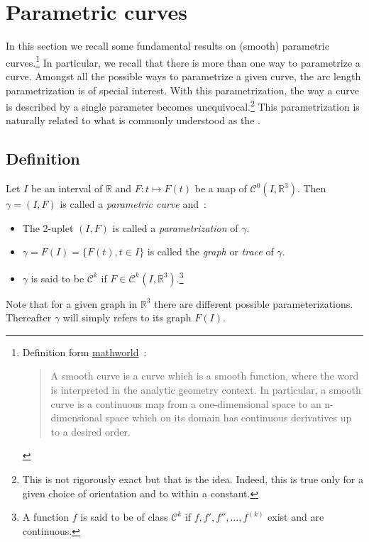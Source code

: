 \section{Parametric curves}\label{sec=paramcrvs}

In this section we recall some fundamental results on (smooth) parametric curves.\footnote{Definition form \href{http://mathworld.wolfram.com/SmoothCurve.html}{mathworld}~: \blockquote{A smooth curve is a curve which is a smooth function,  where the word  is interpreted in the analytic geometry context. In particular, a smooth curve is a continuous map from a one-dimensional space to an n-dimensional space which on its domain has continuous derivatives up to a desired order.}.} In particular, we recall that there is more than one way to parametrize a curve. Amongst all the possible ways to parametrize a given curve, the arc length parametrization is of special interest. With this parametrization, the way a curve is described by a single parameter becomes unequivocal.\footnote{This is not rigorously exact but that is the idea. Indeed, this is true only for a given choice of orientation and to within a constant.} This parametrization is naturally related to what is commonly understood as the . 

\subsection{Definition}
Let $I$ be an interval of $\mathbb{R}$ and $F\colon t \mapsto F(t)$ be a map of ${\mathcal{C}}^{0}(I,{\mathbb{R}}^3)$. Then $\gamma=(I,F)$ is called a \emph{parametric curve} and~:
\begin{itemize}
	\item The 2-uplet $(I,F)$ is called a \emph{parametrization} of $\gamma$.
	\item $\gamma = F(I) = \{F(t), t \in I\}$ is called the \emph{graph} or \emph{trace} of $\gamma$.
	\item $\gamma$ is said to be ${\mathcal{C}}^{k}$ if $F \in {\mathcal{C}^{k}}^{}(I,{\mathbb{R}}^3)$.\footnote{A function $f$ is said to be of class $\mathcal{C}^{k}$ if $f,f',f'', \ldots, f^{(k)}$ exist and are continuous.}
\end{itemize}
Note that for a given graph in ${\mathbb{R}}^3$ there are different possible parameterizations. Thereafter $\gamma$ will simply refers to its graph $F(I)$. 

